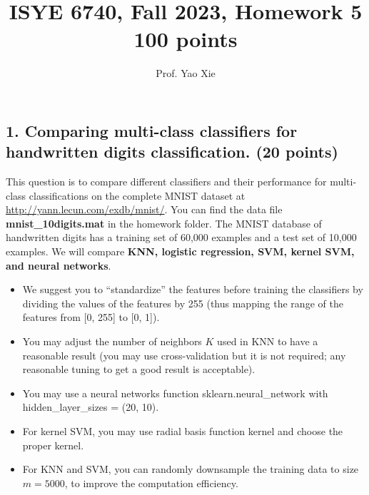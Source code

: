 \documentclass[12pt]{article}
\begin{document}
\title{ISYE 6740, Fall 2023, Homework 5\\{\small 100 points}}
\author{Prof. Yao Xie}
\date{}
\maketitle




\subsection*{1. Comparing multi-class classifiers for handwritten digits classification. (20 points)}

This question is to compare different classifiers and their performance for multi-class classifications on the complete MNIST dataset at \url{http://yann.lecun.com/exdb/mnist/}. You can find the data file \textbf{mnist\_10digits.mat} in the homework folder. The MNIST database of handwritten digits has a training set of 60,000 examples and a test set of 10,000 examples. We will compare {\bf KNN, logistic regression, SVM, kernel SVM, and neural networks}. 

\begin{itemize}

\item We suggest you to ``standardize'' the features before training the classifiers by dividing the values of the features by 255 (thus mapping the range of the features from [0, 255] to [0, 1]).

\item You may adjust the number of neighbors $K$ used in KNN to have a reasonable result (you may use cross-validation but it is not required; any reasonable tuning to get a good result is acceptable).

\item You may use a neural networks function \textsf{sklearn.neural\_network} with \textsf{hidden\_layer\_sizes = (20, 10)}. 


\item For kernel SVM, you may use radial basis function kernel and choose the proper kernel.

\item For KNN and SVM, you can randomly downsample the training data to size $m=5000$, to improve the computation efficiency. 
\end{itemize}
\end{document}

